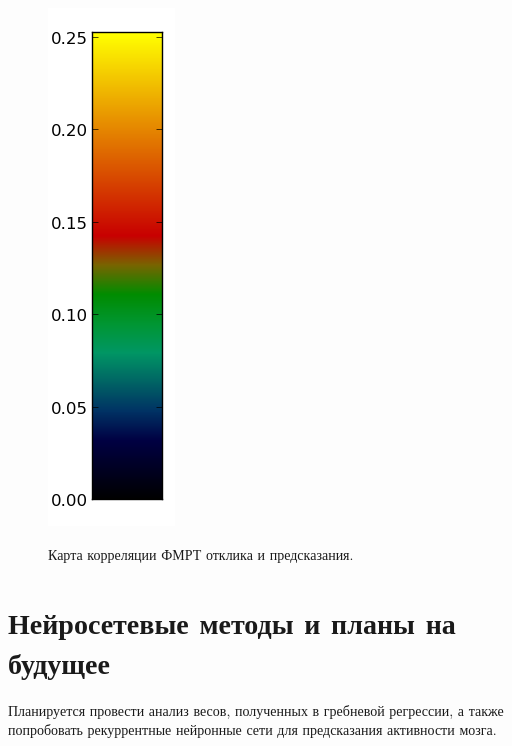 \documentclass[pdftex,ptm,12pt,a4paper]{report}
\theoremstyle{definition}
\begin{document}
\begin{figure}[h]
\begin{multicols}{4}
\hfill
\includegraphics[scale=0.65]{graphics/slices/colorbar.png}
\label{slices}
\end{multicols}
\centering
\caption{Карта корреляции ФМРТ отклика и предсказания.}
\end{figure}


\section{Нейросетевые методы и планы на будущее}
Планируется провести анализ весов, полученных в гребневой регрессии, а также попробовать рекуррентные нейронные сети для предсказания активности мозга.



\end{document}
